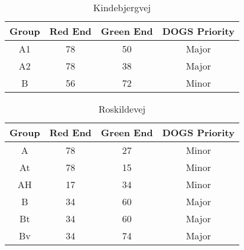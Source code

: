 \begin{table}[ht]
\centering
\begin{tabular}{c|c|c|c}
\textbf{Group} & \textbf{Red End} & \textbf{Green End} & \textbf{DOGS Priority}\\ \hline
A1 & 78 & 50 & Major\\
A2 & 78 & 38 & Major\\
B & 56 & 72 & Minor\\
\end{tabular}
\caption{Kindebjergvej}
\end{table}



\begin{table}[ht]
\centering
\begin{tabular}{c|c|c|c}
\textbf{Group} & \textbf{Red End} & \textbf{Green End} & \textbf{DOGS Priority}\\ \hline
A & 78 & 27 & Minor\\
At & 78 & 15 & Minor\\
AH & 17 & 34 & Minor\\
B & 34 & 60 & Major\\
Bt & 34 & 60 & Major\\
Bv & 34 & 74 & Major\\
\end{tabular}
\caption{Roskildevej}
\end{table}


